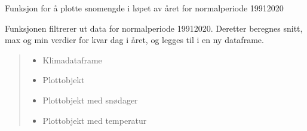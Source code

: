 \documentclass[letterpaper,10pt,norsk]{sphinxmanual}
\begin{document}
\begin{fulllineitems}
\label{\detokenize{index:klimadata.plot.snomengde}}
\pysigstartsignatures
{}
\pysigstopsignatures
\sphinxAtStartPar
Funksjon for å plotte snomengde i løpet av året for normalperiode 1991\sphinxhyphen{}2020

\sphinxAtStartPar
Funksjonen filtrerer ut data for normalperiode 1991\sphinxhyphen{}2020.
Deretter beregnes snitt, max og min verdier for kvar dag i året, og legges til i en ny dataframe.
\begin{quote}\begin{description}
\begin{itemize}
\item {} 
\sphinxAtStartPar
{} \textendash{} Klimadataframe

\item {} 
\sphinxAtStartPar
{} \textendash{} Plott\sphinxhyphen{}objekt

\end{itemize}

\sphinxAtStartPar
\begin{itemize}
\item {} 
\sphinxAtStartPar
{} \textendash{} Plott\sphinxhyphen{}objekt med snødager

\item {} 
\sphinxAtStartPar
{} \textendash{} Plott\sphinxhyphen{}objekt med temperatur

\end{itemize}


\end{description}\end{quote}

\end{fulllineitems}

\end{document}
